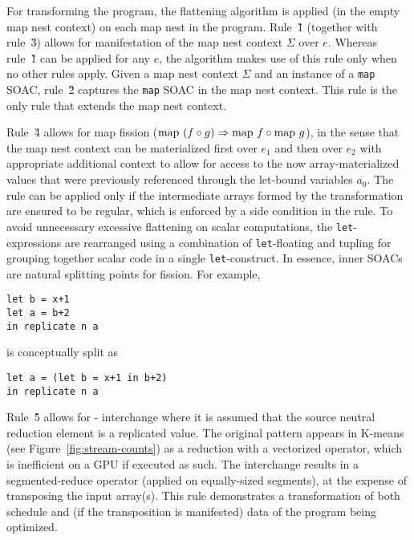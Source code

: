 For transforming the program, the flattening algorithm
is applied (in the empty map nest context) on each map nest in
the program.
%
Rule~\G{1} (together with rule~\G{3}) allows for manifestation of the
map nest context $\Sigma$ over $e$. Whereas rule~\G{1} can be applied
for any $e$, the algorithm makes use of this rule only when no other
rules apply.
%
Given a map nest context $\Sigma$ and an instance of a \texttt{map}
SOAC, rule~\G{2} captures the \texttt{map} SOAC in the
map nest context. This rule is the only rule that extends the map
nest context.


Rule~\G{4} allows for map fission
($\mathrm{map}~(f\circ g) \Rightarrow \mathrm{map}~f\circ \mathrm{map}~g$),
in the sense that the map nest context can be
materialized first over $e_1$ and then over $e_2$ with appropriate
additional context to allow for access to the now array-materialized
values that were previously referenced through the let-bound variables
$\overline{a_0}$. The rule can be applied only if the intermediate
arrays formed by the transformation are ensured to be regular, which is
enforced by a side condition in the rule. To avoid unnecessary
excessive flattening on scalar computations, the \lstinline{let}-expressions
are rearranged using a combination of \lstinline{let}-floating
\cite{PeytonJones:1996:LMB:232627.232630} and tupling for grouping
together scalar code in a single \lstinline{let}-construct.
In essence, inner SOACs are natural splitting points for fission.
For example,
\begin{lstlisting}[aboveskip=-0.6\baselineskip]
let b = x+1
let a = b+2
in replicate n a
\end{lstlisting}
is conceptually split as
\begin{lstlisting}[aboveskip=-0.5\baselineskip]
let a = (let b = x+1 in b+2)
in replicate n a
\end{lstlisting}

Rule~\G{5} allows for - interchange
where it is assumed that the source neutral reduction element is a
replicated value.  The original pattern appears in K-means (see
Figure~\ref{fig:stream-counts}) as a reduction with a vectorized
operator, which is inefficient on a GPU if executed as such. The
interchange results in a segmented-reduce operator (applied on
equally-sized segments), at the expense of transposing the input
array(s).  This rule demonstrates a transformation of both schedule
and (if the transposition is manifested) data of the program being
optimized.

